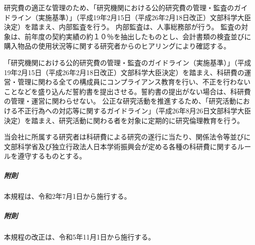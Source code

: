 \documentclass[10pt,a4paper,uplatex]{jsarticle}
\begin{document}
研究費の適正な管理のため、「研究機関における公的研究費の管理・監査のガイドライン（実施基準）」（平成19年2月15日（平成26年2月18日改正）文部科学大臣決定）を踏まえ、内部監査を行う。
\term 内部監査は、人事総務部が行う。
\term 監査の対象は、前年度の契約実績の約１０％を抽出したものとし、会計書類の検査並びに購入物品の使用状況等に関する研究者からのヒアリングにより確認する。

「研究機関における公的研究費の管理・監査のガイドライン（実施基準）」（平成19年2月15日（平成26年2月18日改正）文部科学大臣決定）を踏まえ、科研費の運営・管理に関わる全ての構成員にコンプライアンス教育を行い、不正を行わないことなどを盛り込んだ誓約書を提出させる。誓約書の提出がない場合は、科研費の管理・運営に関わらせない。
\term 公正な研究活動を推進するため、「研究活動における不正行為への対応等に関するガイドライン」（平成26年8月26日文部科学大臣決定）を踏まえ、研究活動に関わる者を対象に定期的に研究倫理教育を行う。

当会社に所属する研究者は科研費による研究の遂行に当たり、関係法令等並びに文部科学省及び独立行政法人日本学術振興会が定める各種の科研費に関するルールを遵守するものとする。
\\

\subparagraph{附則}本規程は、令和2年7月1日から施行する。
\subparagraph{附則}本規程の改正は、令和5年11月1日から施行する。
\end{document}
